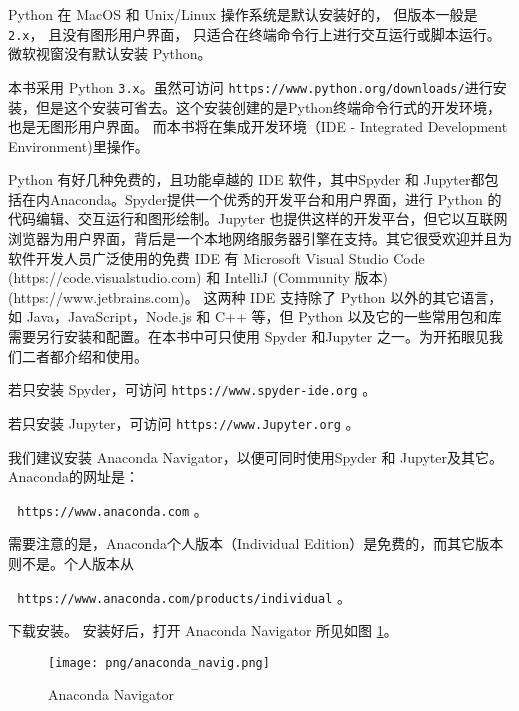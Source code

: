 \documentclass[main.tex]{subfiles}
\begin{document}
Python 在 MacOS 和 Unix/Linux 操作系统是默认安装好的，
但版本一般是 \texttt{2.x}，
且没有图形用户界面，
只适合在终端命令行上进行交互运行或脚本运行。
微软视窗没有默认安装 Python。

本书采用 Python \texttt{3.x}。虽然可访问 \texttt{https://www.python.org/downloads/}进行安装，但是这个安装可省去。这个安装创建的是Python终端命令行式的开发环境，也是无图形用户界面。
而本书将在集成开发环境（IDE - Integrated Development Environment)里操作。

Python 有好几种免费的，且功能卓越的 IDE 软件，其中Spyder 和 Jupyter都包括在内Anaconda。Spyder提供一个优秀的开发平台和用户界面，进行 Python 的代码编辑、交互运行和图形绘制。Jupyter 也提供这样的开发平台，但它以互联网浏览器为用户界面，背后是一个本地网络服务器引擎在支持。其它很受欢迎并且为软件开发人员广泛使用的免费 IDE 有 Microsoft Visual Studio Code (https://code.visualstudio.com) 和 IntelliJ (Community 版本) (https://www.jetbrains.com)。
这两种 IDE 支持除了 Python 以外的其它语言，如 Java，JavaScript，Node.js 和 C++ 等，但 Python 以及它的一些常用包和库需要另行安装和配置。在本书中可只使用 Spyder 和Jupyter 之一。为开拓眼见我们二者都介绍和使用。  


若只安装 Spyder，可访问
\texttt{https://www.spyder-ide.org} 。

若只安装 Jupyter，可访问
\texttt{https://www.Jupyter.org} 。

我们建议安装 Anaconda Navigator，以便可同时使用Spyder 和 Jupyter及其它。 Anaconda的网址是：

\,\,\,\,\texttt{https://www.anaconda.com} 。

\noindent 需要注意的是，Anaconda个人版本（Individual Edition）是免费的，而其它版本则不是。个人版本从

\,\,\,\,\texttt{https://www.anaconda.com/products/individual} 。

\noindent 下载安装。
安装好后，打开 Anaconda Navigator 所见如图 \ref{fig:2.1.1}。

\begin{figure}[h]
	\texttt{[image: png/anaconda\_navig.png]}
	\caption{Anaconda Navigator}\label{fig:2.1.1}
\end{figure}
\end{document}
